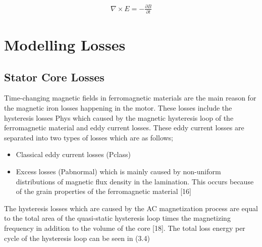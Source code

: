 \begin{align}
  \nabla\times E = - \frac{\partial B}{\partial t}
\end{align}

\section{Modelling Losses} %


\subsection{Stator Core Losses} %

Time-changing magnetic fields in ferromagnetic materials are the main reason
for the magnetic iron losses happening in the motor. These losses include the
hysteresis losses Phys which caused by the magnetic hysteresis loop of the
ferromagnetic material and eddy current losses. These eddy current losses are
separated into two types of losses which are as follows;
\begin{itemize}
\item Classical eddy current losses (Pclass)
 \item  Excess losses (Pabnormal) which is mainly caused by non-uniform distributions of
  magnetic flux density in the lamination. This occurs because of the grain properties
  of the ferromagnetic material [16]
\end{itemize}


The hysteresis losses which are caused by the AC magnetization process are
equal to the total area of the quasi-static hysteresis loop times the magnetizing
frequency in addition to the volume of the core [18]. The total loss energy per cycle
of the hysteresis loop can be seen in (3.4)

